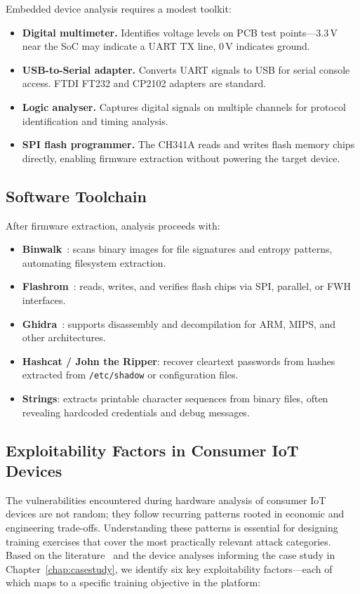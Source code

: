 Embedded device analysis requires a modest toolkit:
\begin{itemize}
    \item \textbf{Digital multimeter.} Identifies voltage levels on PCB test points---3.3\,V near the SoC may indicate a UART TX line, 0\,V indicates ground.
    \item \textbf{USB-to-Serial adapter.} Converts UART signals to USB for serial console access. FTDI FT232 and CP2102 adapters are standard.
    \item \textbf{Logic analyser.} Captures digital signals on multiple channels for protocol identification and timing analysis.
    \item \textbf{SPI flash programmer.} The CH341A reads and writes flash memory chips directly, enabling firmware extraction without powering the target device.
\end{itemize}

\subsection{Software Toolchain}\label{subsec:sw-tools}

After firmware extraction, analysis proceeds with:
\begin{itemize}
    \item \textbf{Binwalk}~\cite{binwalk}: scans binary images for file signatures and entropy patterns, automating filesystem extraction.
    \item \textbf{Flashrom}~\cite{flashrom}: reads, writes, and verifies flash chips via SPI, parallel, or FWH interfaces.
    \item \textbf{Ghidra}~\cite{ghidra}: supports disassembly and decompilation for ARM, MIPS, and other architectures.
    \item \textbf{Hashcat / John the Ripper}: recover cleartext passwords from hashes extracted from \texttt{/etc/shadow} or configuration files.
    \item \textbf{Strings}: extracts printable character sequences from binary files, often revealing hardcoded credentials and debug messages.
\end{itemize}

\subsection{Exploitability Factors in Consumer IoT Devices}\label{subsec:exploitability}

The vulnerabilities encountered during hardware analysis of consumer IoT devices are not random; they follow recurring patterns rooted in economic and engineering trade-offs. Understanding these patterns is essential for designing training exercises that cover the most practically relevant attack categories. Based on the literature~\cite{shwartz2017, costin2014large, genova2025} and the device analyses informing the case study in Chapter~\ref{chap:casestudy}, we identify six key exploitability factors---each of which maps to a specific training objective in the \pcbctf{} platform:

